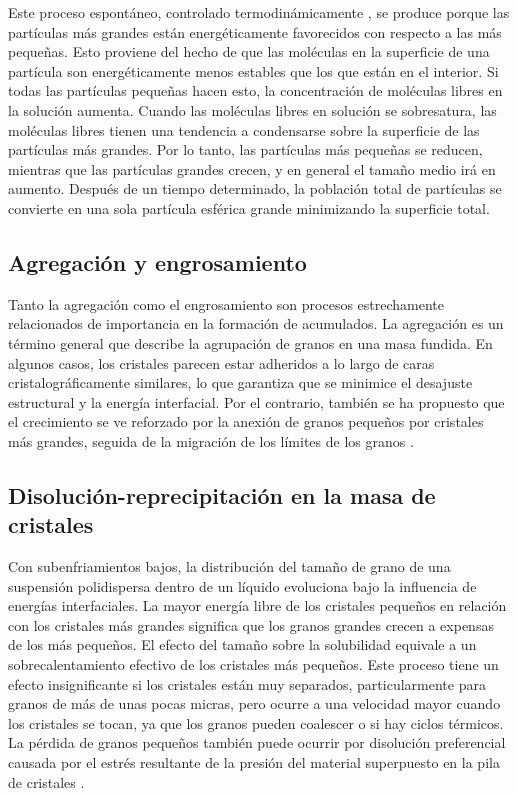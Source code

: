 \documentclass[3pt,twocolumn]{elsarticle}
\begin{document}
Este proceso espontáneo, controlado termodinámicamente \cite{a4}, se produce porque las partículas más grandes están energéticamente favorecidos con respecto a las más pequeñas. Esto proviene del hecho de que las moléculas en la superficie de una partícula son energéticamente menos estables que los que están en el interior. Si todas las partículas pequeñas hacen esto, la concentración de moléculas libres en la solución aumenta. Cuando las moléculas libres en solución se sobresatura, las moléculas libres tienen una tendencia a condensarse sobre la superficie de las partículas más grandes. Por lo tanto, las partículas más pequeñas se reducen, mientras que las partículas grandes crecen, y en general el tamaño medio irá en aumento. Después de un tiempo determinado, la población total de partículas se convierte en una sola partícula esférica grande minimizando la superficie total.

\subsection{Agregaci\'on y engrosamiento}
Tanto la agregación como el engrosamiento son procesos estrechamente relacionados de importancia en la formación de acumulados. La agregación es un término general que describe la agrupación de granos en una masa fundida. En algunos casos, los cristales parecen estar adheridos a lo largo de caras cristalográficamente similares, lo que garantiza que se minimice el desajuste estructural y la energía interfacial. Por el contrario, también se ha propuesto que el crecimiento se ve reforzado por la anexión de granos pequeños por cristales más grandes, seguida de la migración de los límites de los granos \cite{a9}.

\subsection{Disoluci\'on-reprecipitaci\'on en la masa de cristales}
Con subenfriamientos bajos, la distribución del tamaño de grano de una suspensión polidispersa dentro de un líquido evoluciona bajo la influencia de energías interfaciales. La mayor energía libre de los cristales pequeños en relación con los cristales más grandes significa que los granos grandes crecen a expensas de los más pequeños. El efecto del tamaño sobre la solubilidad equivale a un sobrecalentamiento efectivo de los cristales más pequeños. Este proceso tiene un efecto insignificante si los cristales están muy separados, particularmente para granos de más de unas pocas micras, pero ocurre a una velocidad mayor cuando los cristales se tocan, ya que los granos pueden coalescer o si hay ciclos térmicos. La pérdida de granos pequeños también puede ocurrir por disolución preferencial causada por el estrés resultante de la presión del material superpuesto en la pila de cristales \cite{a10}. 
\end{document}
